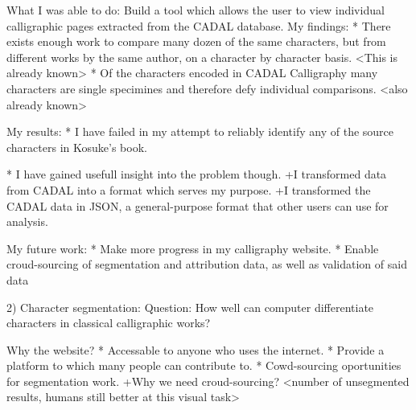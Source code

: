 What I was able to do:
    Build a tool which allows the user to view individual calligraphic pages extracted from the CADAL database.
    My findings:
        * There exists enough work to compare many dozen of the same characters, but from different works by the same author, on a character by character basis. <This is already known>
        *  Of the characters encoded in CADAL Calligraphy many characters are single specimines and therefore defy individual comparisons.  <also already known>
    
    My results:
        *  I have failed in my attempt to reliably identify any of the source characters in Kosuke's book.
        
        *  I have gained usefull insight into the problem though.
            +I transformed data from CADAL into a format which serves my purpose.
            +I transformed the CADAL data in JSON, a general-purpose format that other users can use for analysis.
            
    My future work:
        *  Make more progress in my calligraphy website.
        *  Enable croud-sourcing of segmentation and attribution data, as well as validation of said data


2)  Character segmentation:
    Question:  How well can computer differentiate characters in classical calligraphic works?
    
Why the website?
    * Accessable to anyone who uses the internet.
    * Provide  a platform to which many people can contribute to.
    * Cowd-sourcing oportunities for segmentation work.
        +Why we need croud-sourcing? <number of unsegmented results, humans still better at this visual task>


